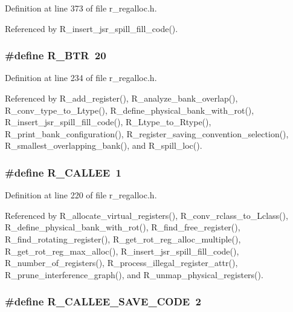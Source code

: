 Definition at line 373 of file r\_\-regalloc.h.

Referenced by R\_\-insert\_\-jsr\_\-spill\_\-fill\_\-code().
\subsubsection{\setlength{\rightskip}{0pt plus 5cm}\#define R\_\-BTR~20}\label{r__regalloc_8h_d952cc9790292c9732a3dc5e9b11d1f2}




Definition at line 234 of file r\_\-regalloc.h.

Referenced by R\_\-add\_\-register(), R\_\-analyze\_\-bank\_\-overlap(), R\_\-conv\_\-type\_\-to\_\-Ltype(), R\_\-define\_\-physical\_\-bank\_\-with\_\-rot(), R\_\-insert\_\-jsr\_\-spill\_\-fill\_\-code(), R\_\-Ltype\_\-to\_\-Rtype(), R\_\-print\_\-bank\_\-configuration(), R\_\-register\_\-saving\_\-convention\_\-selection(), R\_\-smallest\_\-overlapping\_\-bank(), and R\_\-spill\_\-loc().
\subsubsection{\setlength{\rightskip}{0pt plus 5cm}\#define R\_\-CALLEE~1}\label{r__regalloc_8h_ef5ee9ec63b25f4f22b01f0ae1f4f7c3}




Definition at line 220 of file r\_\-regalloc.h.

Referenced by R\_\-allocate\_\-virtual\_\-registers(), R\_\-conv\_\-rclass\_\-to\_\-Lclass(), R\_\-define\_\-physical\_\-bank\_\-with\_\-rot(), R\_\-find\_\-free\_\-register(), R\_\-find\_\-rotating\_\-register(), R\_\-get\_\-rot\_\-reg\_\-alloc\_\-multiple(), R\_\-get\_\-rot\_\-reg\_\-max\_\-alloc(), R\_\-insert\_\-jsr\_\-spill\_\-fill\_\-code(), R\_\-number\_\-of\_\-registers(), R\_\-process\_\-illegal\_\-register\_\-attr(), R\_\-prune\_\-interference\_\-graph(), and R\_\-unmap\_\-physical\_\-registers().
\subsubsection{\setlength{\rightskip}{0pt plus 5cm}\#define R\_\-CALLEE\_\-SAVE\_\-CODE~2}\label{r__regalloc_8h_25ebed91c6e85fbf2bed2977d52ec4e4}




